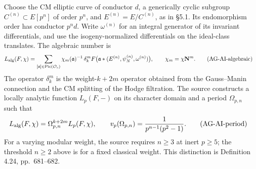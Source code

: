 \documentclass[11pt,a4paper]{article}
\begin{document}
Choose the CM elliptic curve of conductor $d$, a generically cyclic
subgroup $C^{(n)}\subset E[p^n]$ of order $p^n$, and
$E^{(n)}=E/C^{(n)}$, as in \S5.1.  Its endomorphism order has
conductor $p^n d$.  Write $\omega^{(n)}$ for an integral generator of
its invariant differentials, and use the isogeny-normalized
differentials on the ideal-class translates.  The algebraic number is
\[
 L_{\rm alg}(F,\chi)=
 \sum_{[\mathfrak a]\in\operatorname{Pic}(\mathcal O_c)}
   \chi_m(\mathfrak a)^{-1}\,
   \delta_k^mF\bigl(\mathfrak a*(E^{(n)},\psi_N^{(n)},
                                      \omega^{(n)})\bigr),
 \qquad \chi_m=\chi\mathbf N^m.                         \tag{AG-AI-algebraic}
\]
The operator $\delta_k^m$ is the weight-$k+2m$ operator obtained from
the Gauss--Manin connection and the CM splitting of the Hodge
filtration.  The source constructs a locally analytic function
$L_p(F,-)$ on its character domain and a period $\Omega_{p,n}$ such
that
\[
 L_{\rm alg}(F,\chi)=\Omega_{p,n}^{k+2m}L_p(F,\chi),
 \qquad
 v_p(\Omega_{p,n})=\frac1{p^{n-1}(p^2-1)}.               \tag{AG-AI-period}
\]
For a varying modular weight, the source requires $n\geq3$ at inert
$p\geq5$; the threshold $n\geq2$ above is for a fixed classical
weight.  This distinction is Definition 4.24, pp.~681--682.
\end{document}

